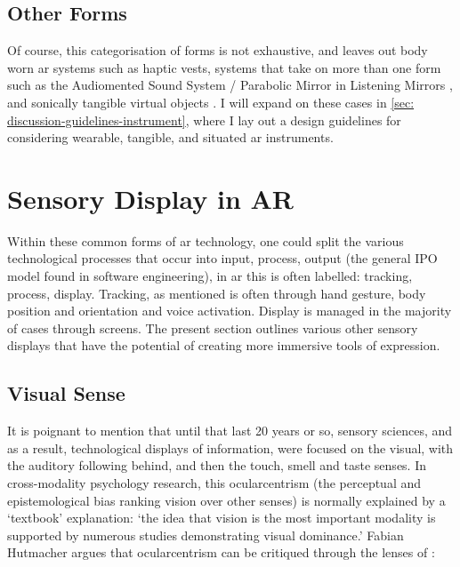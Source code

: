 \subsection{Other Forms}\label{sec: ar-forms-other}
Of course, this categorisation of forms is not exhaustive, and leaves out body worn \gls{ar} systems such as haptic vests, systems that take on more than one form such as the Audiomented Sound System / Parabolic Mirror in Listening Mirrors \citep{chevalier2020}, and sonically tangible virtual objects \citep{schraffenberger2015}. I will expand on these cases in \autoref{sec: discussion-guidelines-instrument}, where I lay out a design guidelines for considering wearable, tangible, and situated \gls{ar} instruments.



\section{Sensory Display in AR}\label{sec: ar-sensory}
Within these common forms of \gls{ar} technology, one could split the various technological processes that occur into input, process, output (the general IPO model found in software engineering), in \gls{ar} this is often labelled: tracking, process, display. Tracking, as mentioned is often through hand gesture, body position and orientation and voice activation. Display is managed in the majority of cases through screens. The present section outlines various other sensory displays that have the potential of creating more immersive tools of expression.

\subsection{Visual Sense}\label{sec: ar-sensory-visual}
It is poignant to mention that until that last 20 years or so, sensory sciences, and as a result, technological displays of information, were focused on the visual, with the auditory following behind, and then the touch, smell and taste senses. In cross-modality psychology research, this ocularcentrism (the perceptual and epistemological bias ranking vision over other senses) is normally explained by a `textbook' explanation: `the idea that vision is the most important modality is supported by numerous studies demonstrating visual dominance.' Fabian Hutmacher argues that ocularcentrism can be critiqued through the lenses of \citeyearpar{hutmacher2019}: 

